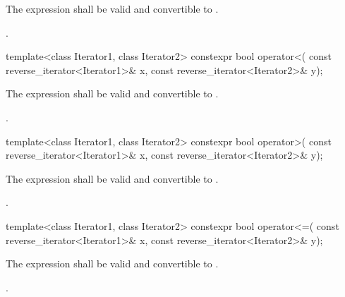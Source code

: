 \begin{itemdescr}
\begin{addedblock}
\pnum
\constraints
The expression  shall be valid and
convertible to .
\end{addedblock}

\pnum
\returns
{}.
\end{itemdescr}

%
\begin{itemdecl}
template<class Iterator1, class Iterator2>
  constexpr bool operator<(
    const reverse_iterator<Iterator1>& x,
    const reverse_iterator<Iterator2>& y);
\end{itemdecl}

\begin{itemdescr}
\begin{addedblock}
\pnum
\constraints
The expression  shall be valid and
convertible to .
\end{addedblock}

\pnum
\returns
{}.
\end{itemdescr}

%
\begin{itemdecl}
template<class Iterator1, class Iterator2>
  constexpr bool operator>(
    const reverse_iterator<Iterator1>& x,
    const reverse_iterator<Iterator2>& y);
\end{itemdecl}

\begin{itemdescr}
\begin{addedblock}
\pnum
\constraints
The expression  shall be valid and
convertible to .
\end{addedblock}

\pnum
\returns
{}.
\end{itemdescr}

%
\begin{itemdecl}
template<class Iterator1, class Iterator2>
  constexpr bool operator<=(
    const reverse_iterator<Iterator1>& x,
    const reverse_iterator<Iterator2>& y);
\end{itemdecl}

\begin{itemdescr}
\begin{addedblock}
\pnum
\constraints
The expression  shall be valid and
convertible to .
\end{addedblock}

\pnum
\returns
{}.
\end{itemdescr}

